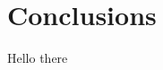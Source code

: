 \thispagestyle{plain}
\newpage
\section{Conclusions}\label{sec:conclusions}

\normalsize

Hello there
